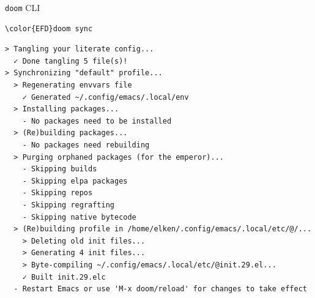 \documentclass[presentation, t]{beamer}
\begin{document}
\begin{frame}[label={sec:org728ea40},fragile]{\texttt{doom} CLI}
 \tiny
\begin{Code}
\begin{Verbatim}
\color{EFD}doom sync
\end{Verbatim}
\end{Code}

\begin{verbatim}
> Tangling your literate config...
  ✓ Done tangling 5 file(s)!
> Synchronizing "default" profile...
  > Regenerating envvars file
    ✓ Generated ~/.config/emacs/.local/env
  > Installing packages...
    - No packages need to be installed
  > (Re)building packages...
    - No packages need rebuilding
  > Purging orphaned packages (for the emperor)...
    - Skipping builds
    - Skipping elpa packages
    - Skipping repos
    - Skipping regrafting
    - Skipping native bytecode
  > (Re)building profile in /home/elken/.config/emacs/.local/etc/@/...
    > Deleting old init files...
    > Generating 4 init files...
    > Byte-compiling ~/.config/emacs/.local/etc/@init.29.el...
    ✓ Built init.29.elc
  - Restart Emacs or use 'M-x doom/reload' for changes to take effect
\end{verbatim}

\end{frame}
\end{document}
